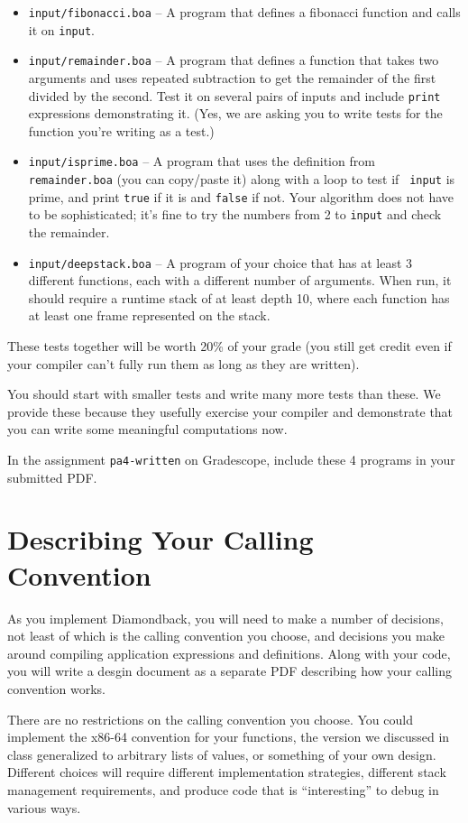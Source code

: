 \documentclass[10pt, oneside]{article}
\begin{document}
\begin{itemize}
\item {\tt input/fibonacci.boa} -- A program that defines a fibonacci
function and calls it on {\tt input}.
\item {\tt input/remainder.boa} -- A program that defines a function that
takes two arguments and uses repeated subtraction to get the remainder of the
first divided by the second. Test it on several pairs of inputs and include
{\tt print} expressions demonstrating it. (Yes, we are asking you to write
tests for the function you're writing as a test.)
\item {\tt input/isprime.boa} -- A program that uses the definition from
{\tt remainder.boa} (you can copy/paste it) along with a loop to test if {\tt
input} is prime, and print {\tt true} if it is and {\tt false} if not. Your
algorithm does not have to be sophisticated; it's fine to try the
numbers from 2 to {\tt input} and check the remainder.
\item {\tt input/deepstack.boa} -- A program of your choice that has at least
3 different functions, each with a different number of arguments. When run,
it should require a runtime stack of at least depth 10, where each function
has at least one frame represented on the stack.
\end{itemize}

These tests together will be worth 20\% of your grade (you still get credit
even if your compiler can't fully run them as long as they are written).

You should start with smaller tests and write many more tests than these. We
provide these because they usefully exercise your compiler and demonstrate
that you can write some meaningful computations now.

In the assignment {\tt pa4-written} on Gradescope, include these 4 programs
in your submitted PDF.


\section*{Describing Your Calling Convention}

As you implement Diamondback, you will need to make a number of decisions,
not least of which is the calling convention you choose, and decisions you
make around compiling application expressions and definitions. Along with
your code, you will write a desgin document as a separate PDF describing how
your calling convention works. 

There are no restrictions on the calling convention you choose. You could
implement the x86-64 convention for your functions, the version we discussed
in class generalized to arbitrary lists of values, or something of your own
design. Different choices will require different implementation strategies,
different stack management requirements, and produce code that is
``interesting'' to debug in various ways.
\end{document}
